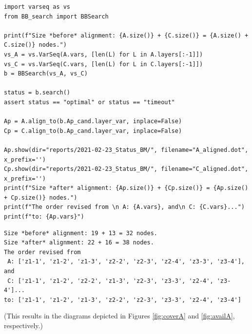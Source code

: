 \documentclass[11pt]{article}
\begin{document}
\begin{verbatim}
import varseq as vs
from BB_search import BBSearch

print(f"Size *before* alignment: {A.size()} + {C.size()} = {A.size() + C.size()} nodes.")
vs_A = vs.VarSeq(A.vars, [len(L) for L in A.layers[:-1]])
vs_C = vs.VarSeq(C.vars, [len(L) for L in C.layers[:-1]])
b = BBSearch(vs_A, vs_C)

status = b.search()
assert status == "optimal" or status == "timeout"

Ap = A.align_to(b.Ap_cand.layer_var, inplace=False)
Cp = C.align_to(b.Ap_cand.layer_var, inplace=False)

Ap.show(dir="reports/2021-02-23_Status_BM/", filename="A_aligned.dot", x_prefix='')
Cp.show(dir="reports/2021-02-23_Status_BM/", filename="C_aligned.dot", x_prefix='')
print(f"Size *after* alignment: {Ap.size()} + {Cp.size()} = {Ap.size() + Cp.size()} nodes.")
print(f"The order revised from \n A: {A.vars}, and\n C: {C.vars}...")
print(f"to: {Ap.vars}")
\end{verbatim}

\begin{verbatim}
Size *before* alignment: 19 + 13 = 32 nodes.
Size *after* alignment: 22 + 16 = 38 nodes.
The order revised from 
 A: ['z1-1', 'z1-2', 'z1-3', 'z2-2', 'z2-3', 'z2-4', 'z3-3', 'z3-4'], and
 C: ['z1-1', 'z1-2', 'z2-2', 'z1-3', 'z2-3', 'z3-3', 'z2-4', 'z3-4']...
to: ['z1-1', 'z1-2', 'z1-3', 'z2-2', 'z2-3', 'z3-3', 'z2-4', 'z3-4']
\end{verbatim}


(This results in the diagrams depicted in Figures \ref{fig:coverA} and \ref{fig:availA}, respectively.)
\end{document}
